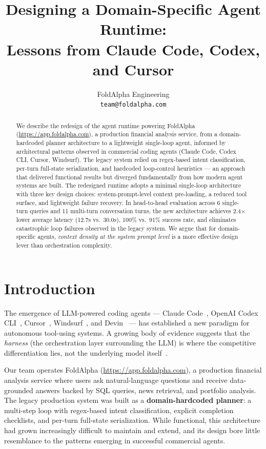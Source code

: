 \documentclass{article}
\title{Designing a Domain-Specific Agent Runtime:\\
Lessons from Claude Code, Codex, and Cursor}
\author{
FoldAlpha Engineering \\
\texttt{team@foldalpha.com}
}
\begin{document}
\maketitle

\begin{abstract}
We describe the redesign of the agent runtime powering FoldAlpha (\url{https://app.foldalpha.com}), a production financial analysis service, from a domain-hardcoded planner architecture to a lightweight single-loop agent, informed by architectural patterns observed in commercial coding agents (Claude Code, Codex CLI, Cursor, Windsurf).
The legacy system relied on regex-based intent classification, per-turn full-state serialization, and hardcoded loop-control heuristics --- an approach that delivered functional results but diverged fundamentally from how modern agent systems are built.
The redesigned runtime adopts a minimal single-loop architecture with three key design choices: system-prompt-level context pre-loading, a reduced tool surface, and lightweight failure recovery.
In head-to-head evaluation across 6 single-turn queries and 11 multi-turn conversation turns, the new architecture achieves 2.4$\times$ lower average latency (12.7s vs.\ 30.0s), 100\% vs.\ 91\% success rate, and eliminates catastrophic loop failures observed in the legacy system.
We argue that for domain-specific agents, \emph{context density at the system prompt level} is a more effective design lever than orchestration complexity.
\end{abstract}

\section{Introduction}

The emergence of LLM-powered coding agents --- Claude Code~\cite{claudecodeleak2026}, OpenAI Codex CLI~\cite{codexcli2025}, Cursor~\cite{cursorprompt2025}, Windsurf~\cite{windsurfprompt2024}, and Devin~\cite{devin2025} --- has established a new paradigm for autonomous tool-using systems.
A growing body of evidence suggests that the \emph{harness} (the orchestration layer surrounding the LLM) is where the competitive differentiation lies, not the underlying model itself~\cite{effectiveharnesses2025}.

Our team operates FoldAlpha (\url{https://app.foldalpha.com}), a production financial analysis service where users ask natural-language questions and receive data-grounded answers backed by SQL queries, news retrieval, and portfolio analysis.
The legacy production system was built as a \textbf{domain-hardcoded planner}: a multi-step loop with regex-based intent classification, explicit completion checklists, and per-turn full-state serialization.
While functional, this architecture had grown increasingly difficult to maintain and extend, and its design bore little resemblance to the patterns emerging in successful commercial agents.
\end{document}
